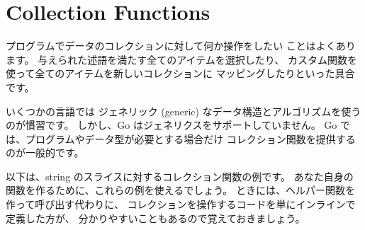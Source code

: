 \section{Collection Functions}

プログラムでデータのコレクションに対して何か操作をしたい ことはよくあります。 与えられた述語を満たす全てのアイテムを選択したり、 カスタム関数を使って全てのアイテムを新しいコレクションに マッピングしたりといった具合です。

いくつかの言語では ジェネリック (generic) なデータ構造とアルゴリズムを使うのが慣習です。 しかし、Go はジェネリクスをサポートしていません。 Go では、プログラムやデータ型が必要とする場合だけ コレクション関数を提供するのが一般的です。

以下は、string のスライスに対するコレクション関数の例です。 あなた自身の関数を作るために、これらの例を使えるでしょう。 ときには、ヘルパー関数を作って呼び出す代わりに、 コレクションを操作するコードを単にインラインで定義した方が、 分かりやすいこともあるので覚えておきましょう。




